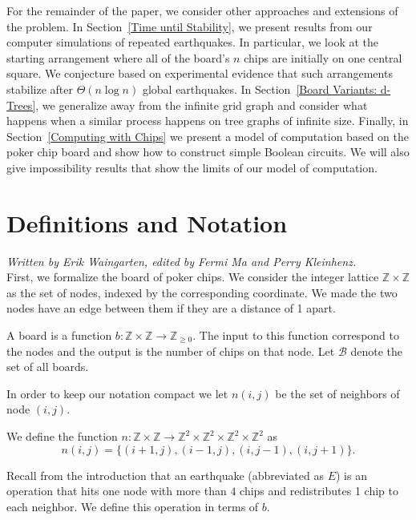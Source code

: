 \documentclass[runningheads,a4paper]{llncs}
\begin{document}
For the remainder of the paper, we consider other approaches and extensions of the problem. 
In  Section~\ref{Time until Stability}, we present results from our computer simulations of repeated earthquakes. In particular, we look at the starting arrangement where all of the board's $n$ chips are initially on one central square.
We conjecture based on experimental evidence that such arrangements stabilize after $\Theta(n \log n)$ global earthquakes. 
In Section~\ref{Board Variants: d-Trees}, we generalize away from the infinite grid graph and consider what happens when a similar process happens on tree graphs of infinite size. 
Finally, in Section~\ref{Computing with Chips} we present a model of computation based on the poker chip board and show how to construct simple Boolean circuits. We will also give impossibility results that show the limits of our model of computation.
\section{Definitions and Notation}
\label{Definitions and Notation}

\emph{Written by Erik Waingarten, edited by Fermi Ma and Perry Kleinhenz.}\\

First, we formalize the board of poker chips. We consider the integer lattice $\mathbb{Z} \times \mathbb{Z}$ as the set of nodes, indexed by the corresponding coordinate. We made the two nodes have an edge between them if they are a distance of 1 apart.

\begin{definition} A board is a function $b: \mathbb{Z} \times \mathbb{Z} \to \mathbb{Z}_{\geq 0}$.
The input to this function correspond to the nodes and the output is the number of chips on that node. Let $\mathcal{B}$ denote the set of all boards.
\end{definition}

In order to keep our notation compact we let $n(i,j)$ be the set of neighbors of node $(i,j)$.
\begin{definition}
We define the function $n: \mathbb{Z} \times \mathbb{Z} \rightarrow \mathbb{Z}^2 \times \mathbb{Z}^2 \times \mathbb{Z}^2 \times \mathbb{Z}^2 $ as 
\begin{equation}
n(i,j) = \{ (i+1, j), (i-1, j), (i, j-1), (i, j+1) \}.
\end{equation}
\end{definition}

Recall from the introduction that an earthquake (abbreviated as $E$) is an operation that hits one node with more than $4$ chips and redistributes 1 chip to each neighbor. We define this operation in terms of $b$.
\end{document}
